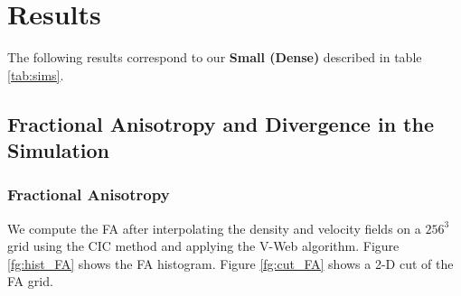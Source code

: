 \documentclass[12pt]{article}
\begin{document}
\section{Results}

The following results correspond to our
 \textbf{Small (Dense)} described in table
  \ref{tab:sims}.
  
\subsection{Fractional Anisotropy and Divergence in the Simulation}

\subsubsection{Fractional Anisotropy}
 We compute the FA after interpolating the density and velocity fields on a $256^{3}$
   grid using the CIC method and applying the V-Web algorithm. Figure \ref{fg:hist_FA} shows the FA histogram. Figure
      \ref{fg:cut_FA} shows a 2-D cut of the FA grid.
\end{document}
